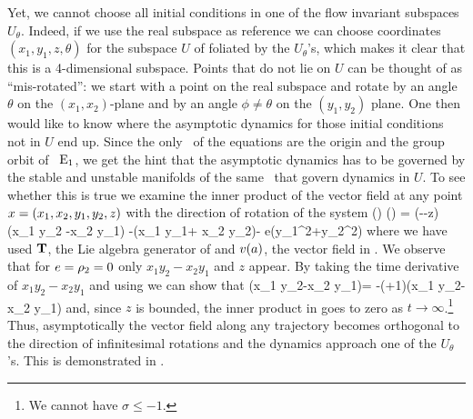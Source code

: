 Yet, we cannot choose all initial conditions in one of the
flow invariant subspaces $U_\theta$. Indeed, if we use the
real subspace as reference we can choose coordinates
$(x_1,y_1,z,\theta)$ for the subspace $U$ of  foliated
by the $U_\theta$'s, which makes it clear that this is a
4-dimensional subspace. Points that do not lie on $U$ can be
thought of as ``mis-rotated'': we start with a point on the
real subspace and rotate by an angle $\theta$ on the
$(x_1,x_2)$-plane and by an angle $\phi\neq\theta$ on the
$(y_1,y_2)$ plane. One then would like to know where the
asymptotic dynamics for those initial conditions not in $U$
end up. Since the only \eqva\ of the equations are the origin
 and the group orbit of \eqv\ $\mathrm{E}_{1}$, we get the hint that the
asymptotic dynamics has to be governed by the stable and
unstable manifolds of the same \eqva\ that govern dynamics in
$U$. To see whether this is true we examine the inner product
of the vector field at any point  $x=(x_1,x_2,y_1,y_2,z)$
with the direction of rotation of the system
\beq
	(\Lg \cdot \ssp) \cdot \vf(\ssp) = \left(\RerCLor-\sigma-z\right)\left(x_1 y_2 -x_2 y_1\right) -\ImrCLor\left(x_1 y_1+ x_2 y_2\right)- e\left(y_1^2+y_2^2\right)
	\label{eq:CLe0ip}
\eeq
where we have used $\mathbf{T}$, the Lie algebra generator
 of  and $v(a)$, the
vector field in . We observe that for
$e=\rho_2=0$ only $x_1 y_2-x_2 y_1$ and $z$ appear. By
taking the time derivative of $x_1 y_2-x_2 y_1$ and using
 we can show that
\beq
	\left(x_1 y_2-x_2 y_1\right)= -(\sigma+1)\left(x_1 y_2-x_2 y_1\right)
\eeq
and, since $z$ is bounded, the inner product in
 goes to zero as
$t\rightarrow\infty$.\footnote{We cannot have $\sigma\leq
-1$.} Thus, asymptotically the vector field along any
trajectory becomes orthogonal to the direction of
infinitesimal rotations and the dynamics approach one of the
$U_\theta$'s. This is demonstrated in .

